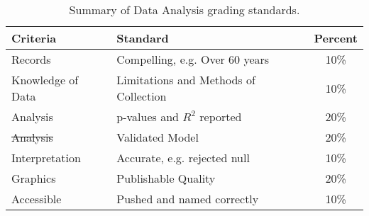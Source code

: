 \begin{table}[h]
\caption{Summary of Data Analysis grading standards.}
\label{tab:datagrading}
\begin{tabular}{llc}\hline
Criteria            &   Standard    & Percent \\ \hline\hline
Records  & Compelling, e.g. Over 60 years & 10\% \\
Knowledge of Data & Limitations and Methods of Collection & 10\% \\
Analysis & p-values and $R^2$ reported  & 20\% \\
{\color{red}\st{Analysis}}          & {\color{red}Validated Model}     & {\color{red}20\%} \\
Interpretation    & Accurate, e.g. rejected null   & 10\% \\
Graphics          & Publishable Quality & 20\% \\
Accessible        & Pushed and named correctly & 10\% \\
\hline
\end{tabular}
\end{table}